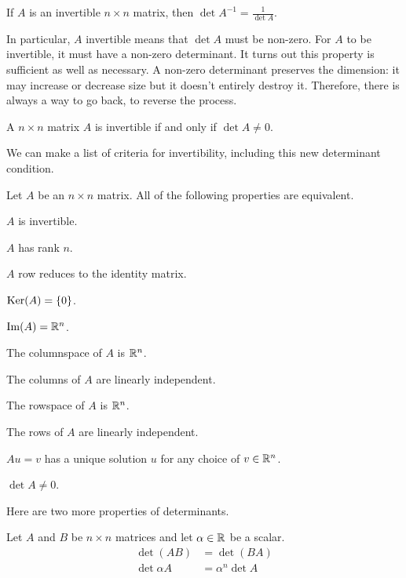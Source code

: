 \documentclass[fleqn]{report}
\begin{document}
\begin{prop}
If $A$ is an invertible $n \times n$ matrix, then $\det A^{-1}
= \frac{1}{\det A}$.
\end{prop}

In particular, $A$ invertible means that $\det A$ must be
non-zero. For $A$ to be invertible, it must have a non-zero
determinant. It turns out this property is sufficient as well
as necessary. A non-zero determinant preserves the dimension:
it may increase or decrease size but it doesn't entirely
destroy it. Therefore, there is always a way to go back, to
reverse the process.

\begin{prop}
A $n \times n$ matrix $A$ is invertible if and only if 
$\det A \neq 0$. 
\end{prop}

We can make a list of criteria for invertibility, including
this new determinant condition.

\begin{prop}
Let $A$ be an $n \times n$ matrix. All of the following
properties are equivalent.
\begin{smallitemize}
\item $A$ is invertible.
\item $A$ has rank $n$.
\item $A$ row reduces to the identity matrix.
\item $\mathrm{Ker}(A) = \{0\}$.
\item $\mathrm{Im}(A) = \mathbb{R}^n$.
\item The columnspace of $A$ is $\mathbb{R}^n$. 
\item The columns of $A$ are linearly independent.
\item The rowspace of $A$ is $\mathbb{R}^n$.
\item The rows of $A$ are linearly independent.
\item $Au = v$ has a unique solution $u$ for any choice of $v
\in \mathbb{R}^n$.
\item $\det A \neq 0$.
\end{smallitemize}
\end{prop}

Here are two more properties of determinants.

\begin{prop}
Let $A$ and $B$ be $n \times n$ matrices and let $\alpha \in
\mathbb{R}$ be a scalar.
\begin{align*}
\det (AB) & = \det (BA) \\
\det \alpha A & = \alpha^n \det A
\end{align*}
\end{prop}
\end{document}
